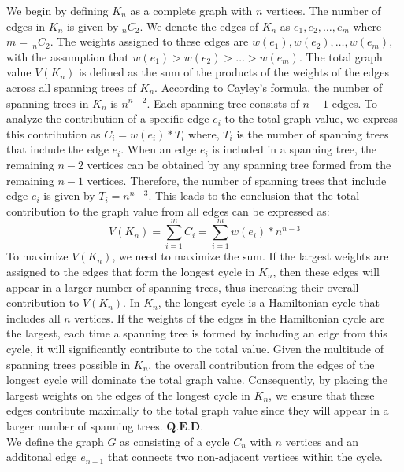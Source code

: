 \documentclass{article}
\begin{document}
We begin by defining $K_{n}$ as a complete graph with $n$ vertices. The number of edges in $K_{n}$ is given by $_{n}C_{2}$. We denote the edges of $K_{n}$ as $e_{1},e_{2},\hdots,e_{m}$ where $m=\,_{n}C_{2}$. The weights assigned to these edges are $w(e_{1}),w(e_{2}),\hdots,w(e_{m})$, with the assumption that $w(e_{1})>w(e_{2})>\hdots>w(e_{m})$. The total graph value $V(K_{n})$ is defined as the sum of the products of the weights of the edges across all spanning trees of $K_{n}$. According to Cayley’s formula, the number of spanning trees in $K_{n}$ is $n^{n-2}$. Each spanning tree consists of $n-1$ edges. To analyze the contribution of a specific edge $e_{i}$ to the total graph value, we express this contribution as $C_{i}=w(e_{i})* T_{i}$ where, $T_{i}$ is the number of spanning trees that include the edge $e_{i}$. When an edge $e_{i}$ is included in a spanning tree, the remaining $n-2$ vertices can be obtained by any spanning tree formed from the remaining $n-1$ vertices. Therefore, the number of spanning trees that include edge $e_{i}$ is given by $T_{i}=n^{n-3}$. This leads to the conclusion that the total contribution to the graph value from all edges can be expressed as: 
$$V(K_{n})=\sum_{i=1}^{m}C_{i}=\sum_{i=1}^{m}w(e_{i})*n^{n-3}$$
To maximize $V(K_{n})$, we need to maximize the sum. If the largest weights are assigned to the edges that form the longest cycle in $K_{n}$, then these edges will appear in a larger number of spanning trees, thus increasing their overall contribution to $V(K_{n})$. In $K_{n}$, the longest cycle is a Hamiltonian cycle that includes all $n$ vertices. If the weights of the edges in the Hamiltonian cycle are the largest, each time a spanning tree is formed by including an edge from this cycle, it will significantly contribute to the total value. Given the multitude of spanning trees possible in $K_{n}$, the overall contribution from the edges of the longest cycle will dominate the total graph value. Consequently, by placing the largest weights on the edges of the longest cycle in $K_{n}$, we ensure that these edges contribute maximally to the total graph value since they will appear in a larger number of spanning trees. $\textbf{Q.E.D.}$\\

We define the graph $G$ as consisting of a cycle $C_{n}$ with $n$ vertices and an additonal edge $e_{n+1}$ that connects two non-adjacent vertices within the cycle.\\
\end{document}
